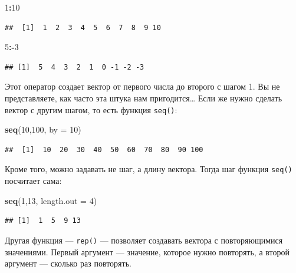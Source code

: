 \documentclass[]{book}
\newenvironment{Shaded}{\begin{snugshade}}{\end{snugshade}}
\newcommand{\KeywordTok}[1]{\textcolor[rgb]{0.13,0.29,0.53}{\textbf{#1}}}
\newcommand{\DataTypeTok}[1]{\textcolor[rgb]{0.13,0.29,0.53}{#1}}
\newcommand{\DecValTok}[1]{\textcolor[rgb]{0.00,0.00,0.81}{#1}}
\newcommand{\OperatorTok}[1]{\textcolor[rgb]{0.81,0.36,0.00}{\textbf{#1}}}
\newcommand{\NormalTok}[1]{#1}
\begin{document}
\begin{Shaded}
\begin{Highlighting}[]
\DecValTok{1}\OperatorTok{:}\DecValTok{10}
\end{Highlighting}
\end{Shaded}

\begin{verbatim}
##  [1]  1  2  3  4  5  6  7  8  9 10
\end{verbatim}

\begin{Shaded}
\begin{Highlighting}[]
\DecValTok{5}\OperatorTok{:-}\DecValTok{3}
\end{Highlighting}
\end{Shaded}

\begin{verbatim}
## [1]  5  4  3  2  1  0 -1 -2 -3
\end{verbatim}

Этот оператор создает вектор от первого числа до второго с шагом 1. Вы
не представляете, как часто эта штука нам пригодится\ldots{} Если же
нужно сделать вектор с другим шагом, то есть функция \texttt{seq()}:

\begin{Shaded}
\begin{Highlighting}[]
\KeywordTok{seq}\NormalTok{(}\DecValTok{10}\NormalTok{,}\DecValTok{100}\NormalTok{, }\DataTypeTok{by =} \DecValTok{10}\NormalTok{)}
\end{Highlighting}
\end{Shaded}

\begin{verbatim}
##  [1]  10  20  30  40  50  60  70  80  90 100
\end{verbatim}

Кроме того, можно задавать не шаг, а длину вектора. Тогда шаг функция
\texttt{seq()} посчитает сама:

\begin{Shaded}
\begin{Highlighting}[]
\KeywordTok{seq}\NormalTok{(}\DecValTok{1}\NormalTok{,}\DecValTok{13}\NormalTok{, }\DataTypeTok{length.out =} \DecValTok{4}\NormalTok{)}
\end{Highlighting}
\end{Shaded}

\begin{verbatim}
## [1]  1  5  9 13
\end{verbatim}

Другая функция --- \texttt{rep()} --- позволяет создавать вектора с
повторяющимися значениями. Первый аргумент --- значение, которое нужно
повторять, а второй аргумент --- сколько раз повторять.
\end{document}
